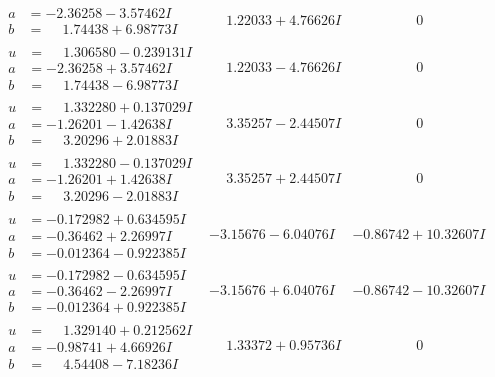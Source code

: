 \documentclass[1p]{elsarticle_modified}
\theoremstyle{definition}
\begin{document}
$$\begin{array}{c|c|c}
\begin{aligned}
a &= -2.36258 - 3.57462 I \\
b &= \phantom{-}1.74438 + 6.98773 I\end{aligned}
 & \phantom{-}1.22033 + 4.76626 I & \phantom{-0.000000 } 0 \\ \hline\begin{aligned}
u &= \phantom{-}1.306580 - 0.239131 I \\
a &= -2.36258 + 3.57462 I \\
b &= \phantom{-}1.74438 - 6.98773 I\end{aligned}
 & \phantom{-}1.22033 - 4.76626 I & \phantom{-0.000000 } 0 \\ \hline\begin{aligned}
u &= \phantom{-}1.332280 + 0.137029 I \\
a &= -1.26201 - 1.42638 I \\
b &= \phantom{-}3.20296 + 2.01883 I\end{aligned}
 & \phantom{-}3.35257 - 2.44507 I & \phantom{-0.000000 } 0 \\ \hline\begin{aligned}
u &= \phantom{-}1.332280 - 0.137029 I \\
a &= -1.26201 + 1.42638 I \\
b &= \phantom{-}3.20296 - 2.01883 I\end{aligned}
 & \phantom{-}3.35257 + 2.44507 I & \phantom{-0.000000 } 0 \\ \hline\begin{aligned}
u &= -0.172982 + 0.634595 I \\
a &= -0.36462 + 2.26997 I \\
b &= -0.012364 - 0.922385 I\end{aligned}
 & -3.15676 - 6.04076 I & -0.86742 + 10.32607 I \\ \hline\begin{aligned}
u &= -0.172982 - 0.634595 I \\
a &= -0.36462 - 2.26997 I \\
b &= -0.012364 + 0.922385 I\end{aligned}
 & -3.15676 + 6.04076 I & -0.86742 - 10.32607 I \\ \hline\begin{aligned}
u &= \phantom{-}1.329140 + 0.212562 I \\
a &= -0.98741 + 4.66926 I \\
b &= \phantom{-}4.54408 - 7.18236 I\end{aligned}
 & \phantom{-}1.33372 + 0.95736 I & \phantom{-0.000000 } 0\\

\end{array}$$
\end{document}
